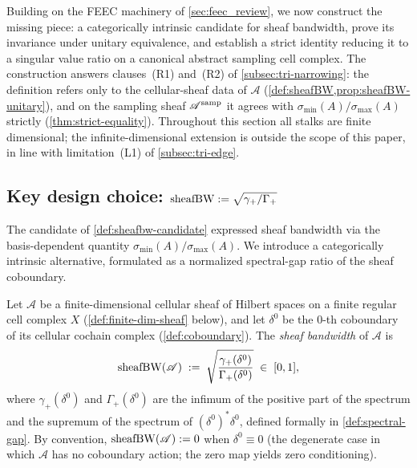 %

Building on the FEEC machinery of \cref{sec:feec_review}, we now
construct the missing piece: a categorically intrinsic candidate for
sheaf bandwidth, prove its invariance under unitary equivalence, and
establish a strict identity reducing it to a singular value ratio on
a canonical abstract sampling cell complex. The construction
answers clauses~\textup{(R1)} and~\textup{(R2)} of
\cref{subsec:tri-narrowing}: the definition refers only to the
cellular-sheaf data of $\mathscr{A}$
(\cref{def:sheafBW,prop:sheafBW-unitary}), and on the sampling sheaf
$\mathscr{A}^{\mathrm{samp}}$ it agrees with $\sigma_{\min}(A)/\sigma_{\max}(A)$
strictly (\cref{thm:strict-equality}). Throughout this section all
stalks are finite dimensional; the infinite-dimensional extension
is outside the scope of this paper, in line with limitation~(L1) of
\cref{subsec:tri-edge}.

\subsection{Key design choice: $\operatorname{sheafBW} := \sqrt{\gamma_+ / \Gamma_+}$}\label{subsec:sheafbw-design}

The candidate of \cref{def:sheafbw-candidate} expressed sheaf
bandwidth via the basis-dependent quantity
$\sigma_{\min}(A)/\sigma_{\max}(A)$. We introduce a categorically
intrinsic alternative, formulated as a normalized spectral-gap
ratio of the sheaf coboundary.

\begin{definition}\label{def:sheafBW}
Let $\mathscr{A}$ be a finite-dimensional cellular sheaf of Hilbert
spaces on a finite regular cell complex $X$
(\cref{def:finite-dim-sheaf} below), and let $\delta^0$ be the
$0$-th coboundary of its cellular cochain complex
(\cref{def:coboundary}). The \emph{sheaf bandwidth} of
$\mathscr{A}$ is
\begin{equation}\label{eq:sheafBW-def}
  \operatorname{sheafBW}(\mathscr{A}) \;:=\;
  \sqrt{\frac{\gamma_+(\delta^0)}{\Gamma_+(\delta^0)}}
  \;\in\; [0, 1],
\end{equation}
where $\gamma_+(\delta^0)$ and $\Gamma_+(\delta^0)$ are the
infimum of the positive part of the spectrum and the supremum of
the spectrum of $(\delta^0)^* \delta^0$, defined formally in
\cref{def:spectral-gap}. By convention,
$\operatorname{sheafBW}(\mathscr{A}) := 0$ when $\delta^0 \equiv 0$ (the
degenerate case in which $\mathscr{A}$ has no coboundary action;
the zero map yields zero conditioning).
\end{definition}

